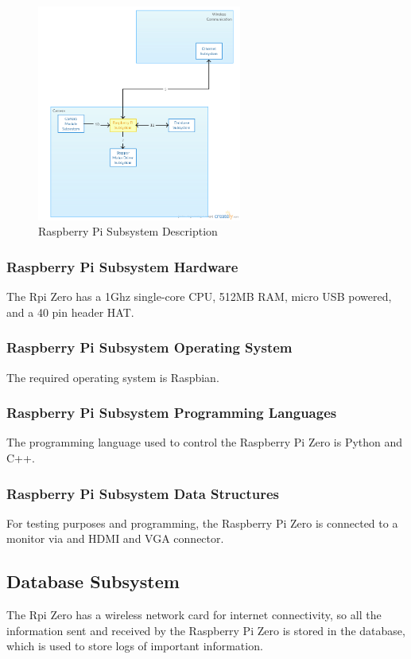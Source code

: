 \begin{figure}[h!] 
 	\centering 
  	\includegraphics[width=0.60\textwidth]{architectural design specification latex/images/ADSdiagrams/raspberrypisubsystem.png} 
 \caption{Raspberry Pi Subsystem Description} 
\end{figure} 




\subsubsection{Raspberry Pi Subsystem Hardware}
The Rpi Zero has a 1Ghz single-core CPU, 512MB RAM, micro USB powered, and a 40 pin header HAT.

\subsubsection{Raspberry Pi Subsystem Operating System}
The required operating system is Raspbian.


\subsubsection{Raspberry Pi Subsystem Programming Languages}
The programming language used to control the Raspberry Pi Zero is Python and C++.

\subsubsection{Raspberry Pi Subsystem Data Structures}
For testing purposes and programming, the Raspberry Pi Zero is connected to a monitor via and HDMI and VGA connector.



\subsection{Database Subsystem}
The Rpi Zero has a wireless network card for internet connectivity, so all the information sent and received by the Raspberry Pi Zero is stored in the database, which is used to store logs of important information.

